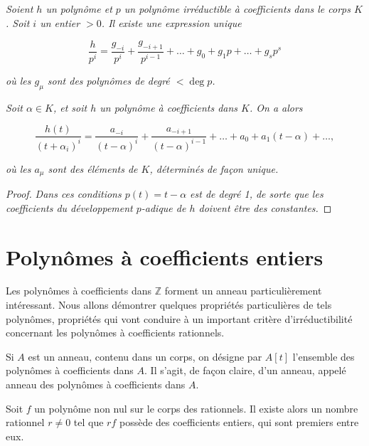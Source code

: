     \begin{theoreme}
        \textit{Soient \( h \) un polynôme et \( p \) un polynôme irréductible à coefficients dans le corps \( K \). Soit \( i \) un entier \( > 0 \). Il existe une expression unique}  

\[
\frac{h}{p^i} = \frac{g_{-i}}{p^i} + \frac{g_{-i+1}}{p^{i-1}} + \dots + g_0 + g_1 p + \dots + g_s p^s
\]

\textit{où les \( g_\mu \) sont des polynômes de degré \( < \deg p \).}  

    \end{theoreme}


    \begin{corollaire}
        \textit{Soit \( \alpha \in K \), et soit \( h \) un polynôme à coefficients dans \( K \). On a alors}  

\[
\frac{h(t)}{(t + \alpha_i)^i} = \frac{a_{-i}}{(t - \alpha)^i} + \frac{a_{-i+1}}{(t - \alpha)^{i-1}} + \dots + a_0 + a_1 (t - \alpha) + \dots,
\]

\textit{où les \( a_\mu \) sont des éléments de \( K \), déterminés de façon unique.}  

    \end{corollaire}
\begin{proof}
    \textit{Dans ces conditions \( p(t) = t - \alpha \) est de degré 1, de sorte que les coefficients du développement \( p \)-adique de \( h \) doivent être des constantes.}  
\end{proof}
\section{Polynômes à coefficients entiers}
Les polynômes à coefficients dans \(\mathbb{Z}\) forment un anneau particulièrement intéressant. Nous allons démontrer quelques propriétés particulières de tels polynômes, propriétés qui vont conduire à un important critère d’irréductibilité concernant les polynômes à coefficients rationnels. 

Si \(A\) est un anneau, contenu dans un corps, on désigne par \(A[t]\) l’ensemble des polynômes à coefficients dans \(A\). Il s’agit, de façon claire, d’un anneau, appelé anneau des polynômes à coefficients dans \(A\).

    \begin{lemme}
        Soit \(f\) un polynôme non nul sur le corps des rationnels. Il existe alors un nombre rationnel \(r \neq 0\) tel que \(rf\) possède des coefficients entiers, qui sont premiers entre eux.

    \end{lemme}

